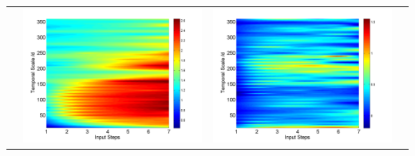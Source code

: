 \documentclass[review]{elsarticle}
\begin{document}
\begin{table}[H]
\begin{tabular}{cccc}
&\begin{minipage}{.3\textwidth}\includegraphics[width=\linewidth]{resultgraph/11532500p.png}\end{minipage}
&\begin{minipage}{.3\textwidth}\includegraphics[width=\linewidth]{resultgraph/11532500diff_ep.png}\end{minipage}

\end{tabular}
\end{table}
\end{document}
